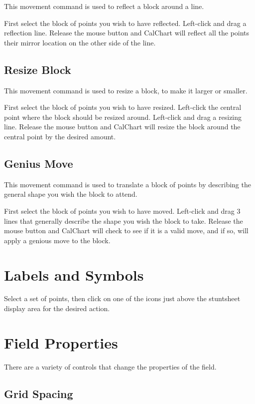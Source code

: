 This movement command is used to reflect a block around a line.

First select the block of points you wish to have reflected.  Left-click and drag a reflection line.  Release the mouse button and CalChart will reflect all the points their mirror location on the other side of the line.

\subsection{Resize Block}\label{resizeblock}

This movement command is used to resize a block, to make it larger or smaller.

First select the block of points you wish to have resized.  Left-click the central point where the block should be resized around.  Left-click and drag a resizing line.  Release the mouse button and CalChart will resize the block around the central point by the desired amount.

\subsection{Genius Move}\label{geniusmove}

This movement command is used to translate a block of points by describing the general shape you wish the block to attend.

First select the block of points you wish to have moved.  Left-click and drag 3 lines that generally describe the shape you wish the block to take.  Release the mouse button and CalChart will check to see if it is a valid move, and if so, will apply a genious move to the block.

\section{Labels and Symbols}\label{symbols}

Select a set of points, then click on one of the icons just above the stuntsheet display area for the desired action.

\section{Field Properties}\label{fieldproperties}

There are a variety of controls that change the properties of the field.

\subsection{Grid Spacing}\label{gridspacing}

